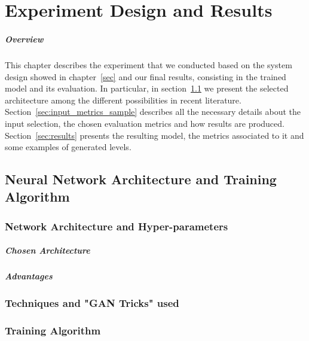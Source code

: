 \chapter{Experiment Design and Results}
\paragraph{Overview} This chapter describes the experiment that we conducted based on the system design showed in chapter~\ref{sec} and our final results, consisting in the trained model and its evaluation. In particular, in section~\ref{sec:nn} we present the selected architecture among the different possibilities in recent literature. Section~\ref{sec:input_metrics_sample} describes all the necessary details about the input selection, the chosen evaluation metrics and how results are produced. Section~\ref{sec:results} presents the resulting model, the metrics associated to it and some examples of generated levels. 
\section{Neural Network Architecture and Training Algorithm}
\label{sec:nn}
\subsection{Network Architecture and Hyper-parameters}
\label{sec:networkarch}

\paragraph{Chosen Architecture}
 
\paragraph{Advantages} %
\label{sec:arch_advantages}

\subsection{Techniques and "GAN Tricks" used}
\subsection{Training Algorithm}


